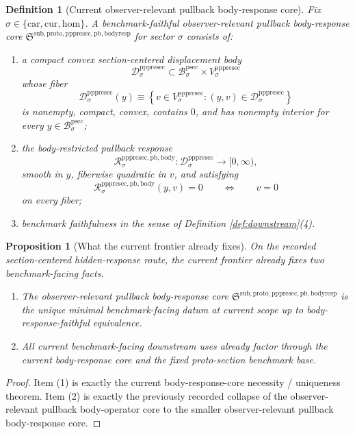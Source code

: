 \documentclass[11pt]{article}
\newcommand{\Car}{\mathrm{car}}
\newcommand{\Cur}{\mathrm{cur}}
\newcommand{\Hom}{\mathrm{hom}}
\newcommand{\ProtoSectionBody}[1]{\mathcal B_{#1}^{\mathrm{psec}}}
\newcommand{\PrePreProtoSectionVertical}[1]{V_{#1}^{\mathrm{pppresec}}}
\newcommand{\PrePreProtoSectionResidualBody}[1]{\mathcal D_{#1}^{\mathrm{pppresec}}}
\newcommand{\PrePreProtoSectionBodyResponse}[1]{\mathscr R_{#1}^{\mathrm{pppresec,pb,body}}}
\newcommand{\PullbackBodyResponseCore}{\mathfrak S^{\mathrm{sub,proto,pppresec,pb,bodyresp}}}
\newtheorem{definition}{Definition}
\newtheorem{proposition}{Proposition}
\begin{document}
\begin{definition}[Current observer-relevant pullback body-response core]
\label{def:bodyresp}
Fix \(\sigma\in\{\Car,\Cur,\Hom\}\). A \emph{benchmark-faithful observer-relevant pullback body-response core} \(\PullbackBodyResponseCore\) for sector \(\sigma\) consists of:
\begin{enumerate}
    \item a compact convex section-centered displacement body
    \[
    \PrePreProtoSectionResidualBody{\sigma}
    \subset
    \ProtoSectionBody{\sigma}\times\PrePreProtoSectionVertical{\sigma}
    \]
    whose fiber
    \[
    \PrePreProtoSectionResidualBody{\sigma}(y)
    \equiv
    \left\{
    v\in\PrePreProtoSectionVertical{\sigma}:(y,v)\in\PrePreProtoSectionResidualBody{\sigma}
    \right\}
    \]
    is nonempty, compact, convex, contains \(0\), and has nonempty interior for every \(y\in\ProtoSectionBody{\sigma}\);
    \item the body-restricted pullback response
    \[
    \PrePreProtoSectionBodyResponse{\sigma}:
    \PrePreProtoSectionResidualBody{\sigma}\to[0,\infty),
    \]
    smooth in \(y\), fiberwise quadratic in \(v\), and satisfying
    \[
    \PrePreProtoSectionBodyResponse{\sigma}(y,v)=0
    \qquad\Longleftrightarrow\qquad
    v=0
    \]
    on every fiber;
    \item benchmark faithfulness in the sense of Definition \ref{def:downstream}(4).
\end{enumerate}
\end{definition}

\begin{proposition}[What the current frontier already fixes]
\label{prop:frontier}
On the recorded section-centered hidden-response route, the current frontier already fixes two benchmark-facing facts.
\begin{enumerate}
    \item The observer-relevant pullback body-response core \(\PullbackBodyResponseCore\) is the unique minimal benchmark-facing datum at current scope up to body-response-faithful equivalence.
    \item All current benchmark-facing downstream uses already factor through the current body-response core and the fixed proto-section benchmark base.
\end{enumerate}
\end{proposition}

\begin{proof}
Item (1) is exactly the current body-response-core necessity / uniqueness theorem. Item (2) is exactly the previously recorded collapse of the observer-relevant pullback body-operator core to the smaller observer-relevant pullback body-response core.
\end{proof}
\end{document}
